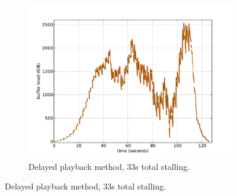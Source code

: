\begin{figure}[htbp]
\begin{subfigure}[b]{0.50\textwidth}
                \includegraphics[width=\textwidth]{images/bufferlevel-startdelay-new.pdf}
                \caption{Delayed playback method, 33s total stalling.}
                \label{c3:fig:bufferlevel-startdelay}
        \end{subfigure}


\end{figure}
